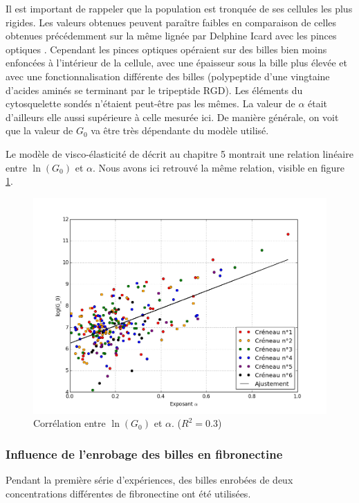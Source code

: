 \documentclass{report}
\begin{document}
  
Il est important de rappeler que la population est tronquée de ses cellules les plus rigides. 
Les valeurs obtenues peuvent paraître faibles en comparaison de celles obtenues précédemment sur la même lignée par Delphine Icard avec les pinces optiques \cite{icard-arcizet_cell_2008}. Cependant les pinces optiques opéraient sur des billes bien moins enfoncées à l'intérieur de la cellule, avec une épaisseur sous la bille plus élevée et avec une fonctionnalisation différente des billes (polypeptide d’une vingtaine d’acides aminés se terminant par le tripeptide RGD). Les éléments du cytosquelette sondés n’étaient peut-être pas les mêmes. La valeur de $\alpha$ était d’ailleurs elle aussi supérieure à celle mesurée ici. De manière générale, on voit que la valeur de $G_0$ va être très dépendante du modèle utilisé. 

Le modèle de visco-élasticité de \cite{balland_power_2006} décrit au chapitre 5 montrait une relation linéaire entre $\ln(G_0)$ et $\alpha$. Nous avons ici retrouvé la même relation, visible en figure \ref{lnG0}. 

\begin{figure}
\includegraphics[scale=0.4]{Figures/lnG0_vs_alpha.png} 
\caption{Corrélation entre $\ln(G_0)$ et $\alpha$.\label{lnG0} ($R^2=0.3$)}
\end{figure}


\subsubsection{Influence de l'enrobage des billes en fibronectine}

Pendant la première série d'expériences, des billes enrobées de deux concentrations différentes de fibronectine ont été utilisées. 
\end{document}
